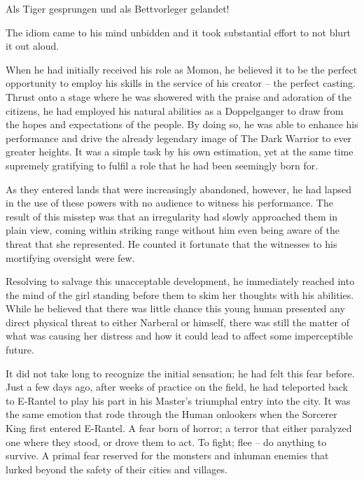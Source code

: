  

Als Tiger gesprungen und als Bettvorleger gelandet!

 

The idiom came to his mind unbidden and it took substantial effort to not blurt it out aloud.

 

When he had initially received his role as Momon, he believed it to be the perfect opportunity to employ his skills in the service of his creator – the perfect casting. Thrust onto a stage where he was showered with the praise and adoration of the citizens, he had employed his natural abilities as a Doppelganger to draw from the hopes and expectations of the people. By doing so, he was able to enhance his performance and drive the already legendary image of The Dark Warrior to ever greater heights. It was a simple task by his own estimation, yet at the same time supremely gratifying to fulfil a role that he had been seemingly born for.

 

As they entered lands that were increasingly abandoned, however, he had lapsed in the use of these powers with no audience to witness his performance. The result of this misstep was that an irregularity had slowly approached them in plain view, coming within striking range without him even being aware of the threat that she represented. He counted it fortunate that the witnesses to his mortifying oversight were few.

 

Resolving to salvage this unacceptable development, he immediately reached into the mind of the girl standing before them to skim her thoughts with his abilities. While he believed that there was little chance this young human presented any direct physical threat to either Narberal or himself, there was still the matter of what was causing her distress and how it could lead to affect some imperceptible future.

 

It did not take long to recognize the initial sensation; he had felt this fear before. Just a few days ago, after weeks of practice on the field, he had teleported back to E-Rantel to play his part in his Master’s triumphal entry into the city. It was the same emotion that rode through the Human onlookers when the Sorcerer King first entered E-Rantel. A fear born of horror; a terror that either paralyzed one where they stood, or drove them to act. To fight; flee – do anything to survive. A primal fear reserved for the monsters and inhuman enemies that lurked beyond the safety of their cities and villages.


